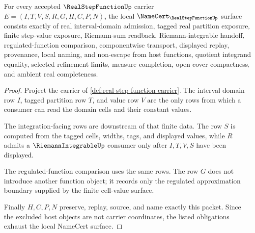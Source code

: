 \begin{theorem}
\label{thm:real-step-function-namecert-obligations}
For every accepted $\RealStepFunctionUp$ carrier $E=(I,T,V,S,R,G,H,C,P,N)$, the local $\NameCert_{\RealStepFunctionUp}$ surface consists exactly of real interval-domain admission, tagged real partition exposure, finite step-value exposure, Riemann-sum readback, Riemann-integrable handoff, regulated-function comparison, componentwise transport, displayed replay, provenance, local naming, and non-escape from host functions, quotient integrand equality, selected refinement limits, measure completion, open-cover compactness, and ambient real completeness.
\end{theorem}
\begin{proof}
Project the carrier of \autoref{def:real-step-function-carrier}. The interval-domain row $I$, tagged partition row $T$, and value row $V$ are the only rows from which a consumer can read the domain cells and their constant values.

The integration-facing rows are downstream of that finite data. The row $S$ is computed from the tagged cells, widths, tags, and displayed values, while $R$ admits a $\RiemannIntegrableUp$ consumer only after $I,T,V,S$ have been displayed.

The regulated-function comparison uses the same rows. The row $G$ does not introduce another function object; it records only the regulated approximation boundary supplied by the finite cell-value surface.

Finally $H,C,P,N$ preserve, replay, source, and name exactly this packet. Since the excluded host objects are not carrier coordinates, the listed obligations exhaust the local NameCert surface.
\end{proof}

